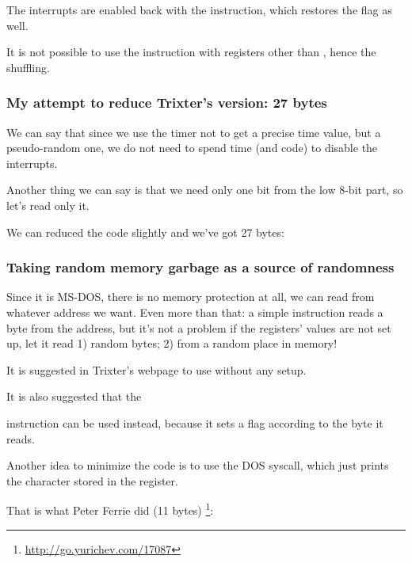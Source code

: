 The interrupts are enabled back with the  instruction, which restores the  flag as well.

It is not possible to 
use the  instruction with registers other than , 
hence the shuffling.

\subsubsection{
My attempt to reduce Trixter's version: 27 bytes}

We can say that since we use the timer not 
to get a precise time value, but a pseudo-random one, we do not need
to spend time (and code) to disable the interrupts.

Another thing we can say is that we need only one bit from the low 8-bit part, so let's read only it.

We can reduced the code slightly and we've got 27 bytes:



\subsubsection{
Taking random memory garbage as a source of randomness}

Since it is MS-DOS, there is no memory protection at all, we can read from whatever address we want.
Even more than that: a simple  
instruction reads a byte from the  address, but it's not a problem
if the registers' values are not set up, let it read 1) random bytes; 2) from a random place in memory!

It is suggested in Trixter's webpage\FNURLTRIXTER 
to use  without any setup.

It is also suggested that the  

instruction can be used instead, because it sets a flag according to the byte it reads.


Another idea to minimize the code is to use the  DOS syscall, which just prints the character stored in the  register.

That is what Peter Ferrie \AndENRU \HERMIT{} did (11  bytes)
\footnote{\url{http://go.yurichev.com/17087}}:



